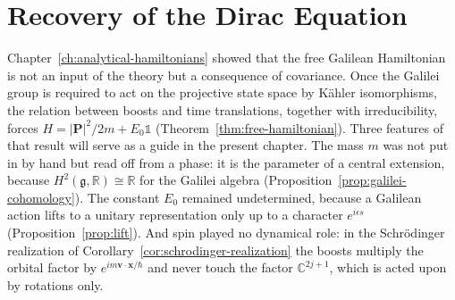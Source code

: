 
\setlength{\headwidth}{\textwidth}


	\setcounter{chapter}{5}
	
	\chapter{Recovery of the Dirac Equation}
	\label{ch:dirac}
	
	Chapter~\ref{ch:analytical-hamiltonians} showed that the free Galilean Hamiltonian is not an input of the theory but a consequence of covariance. Once the Galilei group is required to act on the projective state space by Kähler isomorphisms, the relation between boosts and time translations, together with irreducibility, forces $H=|\mathbf{P}|^2/2m+E_0\mathbb{1}$ (Theorem~\ref{thm:free-hamiltonian}). Three features of that result will serve as a guide in the present chapter. The mass $m$ was not put in by hand but read off from a phase: it is the parameter of a central extension, because $H^2(\mathfrak{g},\mathbb{R})\cong\mathbb{R}$ for the Galilei algebra (Proposition~\ref{prop:galilei-cohomology}). The constant $E_0$ remained undetermined, because a Galilean action lifts to a unitary representation only up to a character $e^{i\epsilon s}$ (Proposition~\ref{prop:lift}). And spin played no dynamical role: in the Schr\"odinger realization of Corollary~\ref{cor:schrodinger-realization} the boosts multiply the orbital factor by $e^{im\mathbf{v}\cdot\mathbf{x}/\hbar}$ and never touch the factor $\mathbb{C}^{2j+1}$, which is acted upon by rotations only.
	

